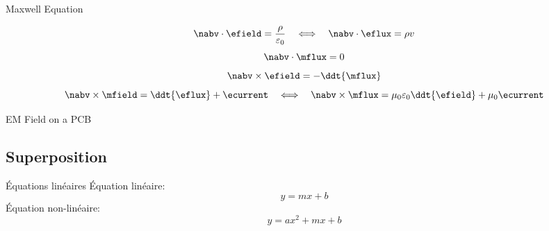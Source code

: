 \begin{frame}{Maxwell Equation}
    \begin{twocolumns}[0.3]
    \leftcol
    \rightcol
        \vspace{-8pt}
        \begin{equation}
                \nabv \cdot \efield = \frac{\rho}{\varepsilon_0}
                \hspace{1em} \Longleftrightarrow \hspace{1.0em}
                \nabv \cdot \eflux = \rho v
        \end{equation}
        \vspace{-8pt}
        \begin{equation}
            \nabv \cdot \mflux = 0
        \end{equation}
        \vspace{-10pt}
        \begin{equation}
            \nabv \times \efield = -\ddt{\mflux}
        \end{equation}
        \vspace{-10pt}
        \begin{equation}
            \nabv \times \mfield = \ddt{\eflux} + \ecurrent
            \hspace{1em} \Longleftrightarrow \hspace{1.0em}
            \nabv \times \mflux = \mu_0 \varepsilon_0 \ddt{\efield} + \mu_0 \ecurrent
        \end{equation}
 \end{twocolumns}
\end{frame}

\begin{frame}{EM Field on a PCB}
    \vspace{-20pt}
\end{frame}

\subsection[1min - Max]{Superposition }
\maxbackground

\begin{frame}{Équations linéaires}
    Équation linéaire:
    \begin{equation}
        y = mx+b
    \end{equation}
    Équation non-linéaire:
    \begin{equation}
        y = ax^2 + mx + b
    \end{equation}
\end{frame}

